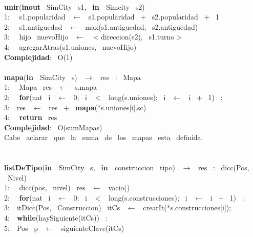 \begin{Algoritmos}
    \\
    \makebox[\linewidth]{\rule{\textwidth}{0.4pt}}
    \textbf{unir}(\textbf{inout} \ SimCity \ s1, \ \textbf{in \ }Simcity \ s2)\\
    1: \  \ s1.popularidad \ $\leftarrow$ \ s1.popularidad \ + \ s2.popularidad \ + \ 1\\
    2: \  \ s1.antiguedad \ $\leftarrow$ \ max(s1.antiguedad, \ s2.antiguedad)\\
    3: \  \ hijo \ nuevoHijo \ $\leftarrow$ \ $<$direccion(s2), \ s1.turno$>$\\
    4: \  \ agregarAtras(s1.uniones, \ nuevoHijo)\\
    \textbf{Complejidad}: \ O(1)\\
    \makebox[\linewidth]{\rule{\textwidth}{0.4pt}}
    \\
    \makebox[\linewidth]{\rule{\textwidth}{0.4pt}}
    \textbf{mapa}(\textbf{in \ }SimCity \ s) \ $\rightarrow $ \ res \ : \ Mapa \ \\
    1: \  \ Mapa \ res \ $\leftarrow$ \ s.mapa\\
    2: \  \ \textbf{for}(nat \ i \ $\leftarrow$ \ 0; \ i \ $<$ \ long(s.uniones); \ i \ $\leftarrow$ \ i \ + \ 1) \ : \ \\
    3:\indent  \  \ res \ $\leftarrow$ \ res \ + \ \textbf{mapa}(*s.uniones[i].sc)\\
    4: \  \ \textbf{return} \ res\\
    \textbf{Complejidad}: \ O(sumMapas) \ \\
    Cabe \ aclarar \ que \ la \ suma \ de \ los \ mapas \ esta \ definida.\\
    \makebox[\linewidth]{\rule{\textwidth}{0.4pt}}
    \\
    \pagebreak\\
    \makebox[\linewidth]{\rule{\textwidth}{0.4pt}}
    \textbf{listDeTipo}(\textbf{in \ }SimCity \ s, \ \textbf{in \ }construccion \ tipo) \ $\rightarrow $ \ res \ : \ dicc(Pos, \ Nivel)\\
    1: \  \ dicc(pos, \ nivel) \ res \ $\leftarrow$ \ vacio()\\
    2: \  \ \textbf{for}(nat \ i \ $\leftarrow$ \ 0; \ i \ $<$ \ long(s.construcciones); \ i \ $\leftarrow$ \ i \ + \ 1) \ : \ \\
    3:\indent  \  \ itDicc(Pos, \ Construccion) \ itCs \ $\leftarrow$ \ crearIt(*s.construcciones[i]);\\
    4:\indent  \  \ \textbf{while}(haySiguiente(itCs)) \ :\\
    5:\indent \indent  \  \ Pos \ p \ $\leftarrow$ \ siguienteClave(itCs)\\

\end{Algoritmos}
